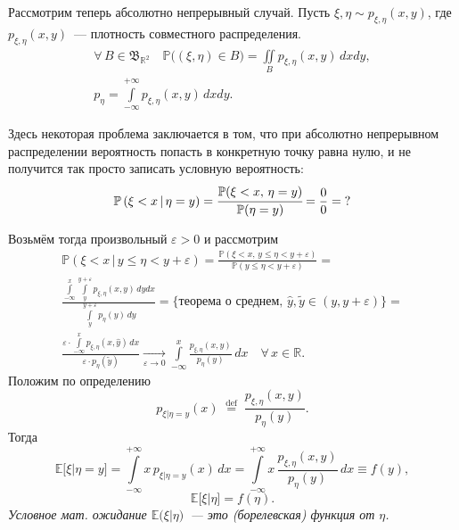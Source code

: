     Рассмотрим теперь абсолютно непрерывный случай.
    Пусть $\xi, \eta \sim p_{\xi, \eta}(x, y)$, где $p_{\xi, \eta}(x, y)$~--- плотность совместного распределения.
    \begin{gather*}
        \forall \, B \in \mathfrak{B}_{\mathbb{R}^2} \quad \mathbb{P}\bigl( (\xi, \eta) \in B\bigr) = \iint\limits_{B} p_{\xi, \eta}(x, y) \, dxdy, \\
        p_{\eta} = \int\limits_{-\infty}^{+\infty} p_{\xi, \eta} (x, y)\, dxdy.
    \end{gather*}

    Здесь некоторая проблема заключается в том, что при абсолютно непрерывном распределении вероятность попасть в конкретную точку равна нулю,
    и не получится так просто записать условную вероятность:
    \begin{equation*}
        \mathbb{P}\left( \xi < x \, |\, \eta = y\right) = \cfrac{\mathbb{P}(\xi < x, \, \eta = y)}{\mathbb{P}(\eta = y)}  = \frac{0}{0} = \; ?
    \end{equation*}

    Возьмём тогда произвольный $\varepsilon > 0$ и рассмотрим
    \begin{gather*}
        \mathbb{P}(\xi < x\, | \, y \leqslant \eta < y + \varepsilon) = \frac{\mathbb{P}(\xi < x, \, y \leqslant \eta < y + \varepsilon)}{\mathbb{P}(y \leqslant \eta < y + \varepsilon)} = \\
        \frac{\int\limits_{-\infty}^{x} \int\limits_{y}^{y + \varepsilon} p_{\xi, \eta}(x, y) \, dydx}{\int\limits_{y}^{y + \varepsilon} p_{\eta}(y)\,dy} = \text{\{теорема о среднем, } \hat{y}, \tilde{y} \in (y, y + \varepsilon) \} = \\
        \frac{\varepsilon \cdot \int\limits_{-\infty}^{x} p_{\xi, \eta}(x, \hat{y}) \, dx}{\varepsilon \cdot p_{\eta}(\tilde{y})} \xrightarrow[\varepsilon \to 0]{} 
        \int\limits_{-\infty}^{x} \frac{p_{\xi, \eta}(x, y)}{p_{\eta}(y)} \, dx \quad \forall \, x \in \mathbb{R}.
    \end{gather*}
    Положим по определению
    $$ p_{\xi | \eta = y}(x) \; \overset{\text{def}}{=} \; \frac{p_{\xi, \eta}(x, y)}{p_{\eta}(y)}.$$
    Тогда 
    \begin{equation}
        \label{cond_exp:abs_continious}
        \boxed{\mathbb{E} \bigl[ \xi | \eta = y \bigr] = 
        \int\limits_{-\infty}^{+\infty} x \, p_{\xi | \eta = y}(x) \, dx = 
        \int\limits_{-\infty}^{+\infty} x \, \frac{p_{\xi, \eta}(x, y)}{p_{\eta}(y)} \, dx \equiv 
        f(y),}
    \end{equation}
    \begin{equation*}
        \mathbb{E} \bigl[ \xi | \eta \bigr] = f(\eta).
    \end{equation*}
    \textit{Условное мат. ожидание $\mathbb{E} \bigl(\xi | \eta\bigr)$~--- это (борелевская) функция от $\eta$.}
    
